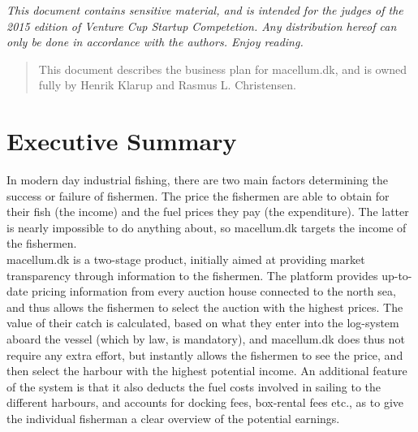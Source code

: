 \documentclass[12pt]{article}
\begin{document}

\begin{center}
\textit{This document contains sensitive material, and is intended for the judges of the 2015 edition of Venture Cup Startup Competetion. Any distribution hereof can only be done in accordance with the authors. Enjoy reading.}
\end{center}

\tableofcontents

\cleardoublepage
\begin{abstract}
\begin{center}
	This document describes the business plan for macellum.dk, and is owned fully by Henrik Klarup and Rasmus L. Christensen. 
\end{center}

\end{abstract}

\section{Executive Summary}
In modern day industrial fishing, there are two main factors determining the success or failure of fishermen. The price the fishermen are able to obtain for their fish (the income) and the fuel prices they pay (the expenditure). The latter is nearly impossible to do anything about, so macellum.dk targets the income of the fishermen.\\

macellum.dk is a two-stage product, initially aimed at providing market transparency through information to the fishermen. The platform provides up-to-date pricing information from every auction house connected to the north sea, and thus allows the fishermen to select the auction with the highest prices. The value of their catch is calculated, based on what they enter into the log-system aboard the vessel (which by law, is mandatory), and macellum.dk does thus not require any extra effort, but instantly allows the fishermen to see the price, and then select the harbour with the highest potential income. An additional feature of the system is that it also deducts the fuel costs involved in sailing to the different harbours, and accounts for docking fees, box-rental fees etc., as to give the individual fisherman a clear overview of the potential earnings.\\
\end{document}
